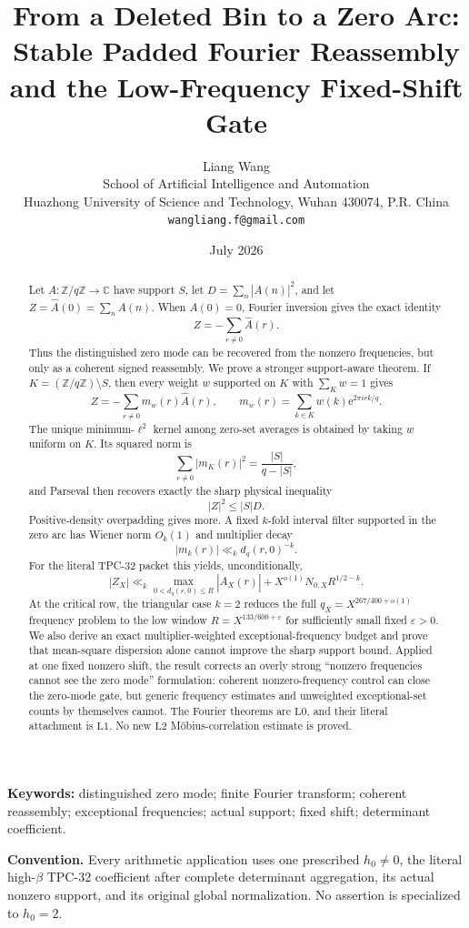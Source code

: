 \documentclass[11pt]{article}
\title{\textbf{From a Deleted Bin to a Zero Arc:}\\
Stable Padded Fourier Reassembly and the
Low-Frequency Fixed-Shift Gate}
\author{Liang Wang\\
School of Artificial Intelligence and Automation\\
Huazhong University of Science and Technology, Wuhan 430074, P.R. China\\
\texttt{wangliang.f@gmail.com}}
\date{July 2026}
\theoremstyle{definition}
\theoremstyle{remark}
\newcommand{\C}{\mathbb C}
\newcommand{\Z}{\mathbb Z}
\newcommand{\ee}{\mathrm e}
\newcommand{\Lzero}{\mathrm{L0}}
\newcommand{\Lone}{\mathrm{L1}}
\newcommand{\Ltwo}{\mathrm{L2}}
\begin{document}
\maketitle

\begin{abstract}
Let \(A:\Z/q\Z\to\C\) have support \(S\), let
\(D=\sum_n|A(n)|^2\), and let
\(Z=\widehat A(0)=\sum_nA(n)\).  When \(A(0)=0\), Fourier inversion
gives the exact identity
\[
 Z=-\sum_{r\ne0}\widehat A(r).
\]
Thus the distinguished zero mode can be recovered from the nonzero
frequencies, but only as a coherent signed reassembly.  We prove a
stronger support-aware theorem.  If \(K=(\Z/q\Z)\setminus S\), then
every weight \(w\) supported on \(K\) with \(\sum_Kw=1\) gives
\[
 Z=-\sum_{r\ne0}m_w(r)\widehat A(r),\qquad
 m_w(r)=\sum_{k\in K}w(k)\ee^{2\pi i rk/q}.
\]
The unique minimum-\(\ell^2\) kernel among zero-set averages is
obtained by taking \(w\) uniform on \(K\).  Its squared norm is
\[
 \sum_{r\ne0}|m_K(r)|^2=\frac{|S|}{q-|S|},
\]
and Parseval then recovers exactly the sharp physical inequality
\[
 |Z|^2\le |S|D.
\]
Positive-density overpadding gives more.  A fixed \(k\)-fold
interval filter supported in the zero arc has Wiener norm \(O_k(1)\)
and multiplier decay
\[
 |m_k(r)|\ll_k d_q(r,0)^{-k}.
\]
For the literal TPC-32 packet this yields, unconditionally,
\[
 |Z_X|\ll_k
 \max_{0<d_q(r,0)\le R}|\widehat A_X(r)|
 +
 X^{o(1)}N_{0,X}R^{1/2-k}.
\]
At the critical row, the triangular case \(k=2\) reduces the full
\(q_X=X^{267/400+o(1)}\) frequency problem to the low window
\(R=X^{133/600+\varepsilon}\) for sufficiently small fixed
\(\varepsilon>0\).  We also derive an exact
multiplier-weighted exceptional-frequency budget and prove that
mean-square dispersion alone cannot improve the sharp support bound.
Applied at one fixed nonzero shift, the result corrects an overly
strong ``nonzero frequencies cannot see the zero mode'' formulation:
coherent nonzero-frequency control can close the zero-mode gate, but
generic frequency estimates and unweighted exceptional-set counts by
themselves cannot.
The Fourier theorems are \(\Lzero\), and their literal attachment is
\(\Lone\).  No new \(\Ltwo\) M\"obius-correlation estimate is proved.
\end{abstract}

\noindent\textbf{Keywords:} distinguished zero mode; finite Fourier
transform; coherent reassembly; exceptional frequencies; actual
support; fixed shift; determinant coefficient.

\medskip
\noindent\textbf{Convention.}
Every arithmetic application uses one prescribed \(h_0\ne0\), the
literal high-\(\beta\) TPC-32 coefficient after complete determinant
aggregation, its actual nonzero support, and its original global
normalization.  No assertion is specialized to \(h_0=2\).









\begingroup
\sloppy
{}


\endgroup
\end{document}
